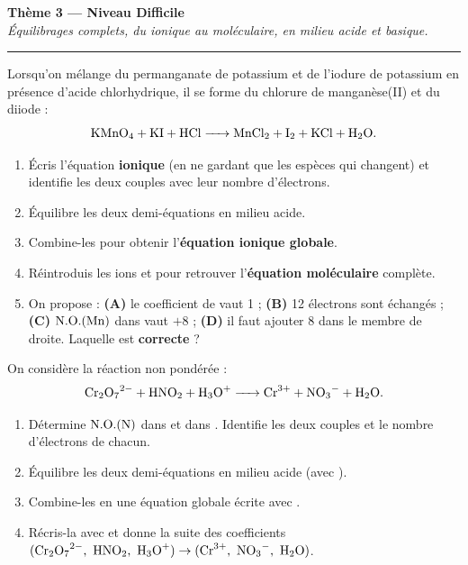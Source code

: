 \documentclass[11pt,a4paper]{article}
\newcommand{\NO}{\ensuremath{\mathrm{N.O.}}}
\newcounter{exo}
\begin{document}
\begin{center}
{\LARGE\bfseries\color{primarydark}Thème 3 — Niveau Difficile}\\[2pt]
{\small\itshape Équilibrages complets, du ionique au moléculaire, en milieu acide et basique.}\\[-4pt]
{\color{primary}\rule{\textwidth}{1pt}}
\end{center}

\begin{exo}
Lorsqu'on mélange du permanganate de potassium et de l'iodure de potassium en présence d'acide
chlorhydrique, il se forme du chlorure de manganèse(II) et du diiode :
\[
\ce{KMnO4 + KI + HCl -> MnCl2 + I2 + KCl + H2O}.
\]
\begin{enumerate}[label=\textbf{\alph*)},leftmargin=2.2em,topsep=2pt,itemsep=2pt]
  \item Écris l'équation \textbf{ionique} (en ne gardant que les espèces qui changent) et identifie les
        deux couples avec leur nombre d'électrons.
  \item Équilibre les deux demi-équations en milieu acide.
  \item Combine-les pour obtenir l'\textbf{équation ionique globale}.
  \item Réintroduis les ions  et  pour retrouver l'\textbf{équation moléculaire} complète.
  \item On propose : \textbf{(A)} le coefficient de  vaut 1 ; \textbf{(B)} 12 électrons sont
        échangés ; \textbf{(C)} $\NO(\ce{Mn})$ dans  vaut $+8$ ; \textbf{(D)} il faut ajouter
        8  dans le membre de droite. Laquelle est \textbf{correcte} ?
\end{enumerate}
\end{exo}

\begin{exo}
On considère la réaction non pondérée :
\[
\ce{Cr2O7^{2-} + HNO2 + H3O+ -> Cr^{3+} + NO3^- + H2O}.
\]
\begin{enumerate}[label=\textbf{\alph*)},leftmargin=2.2em,topsep=2pt,itemsep=2pt]
  \item Détermine $\NO(\ce{N})$ dans  et dans . Identifie les deux couples et le
        nombre d'électrons de chacun.
  \item Équilibre les deux demi-équations en milieu acide (avec ).
  \item Combine-les en une équation globale écrite avec .
  \item Récris-la avec  et donne la suite des coefficients
        $(\ce{Cr2O7^{2-}},\ \ce{HNO2},\ \ce{H3O+}) \to (\ce{Cr^{3+}},\ \ce{NO3^-},\ \ce{H2O})$.
\end{enumerate}
\end{exo}
\end{document}
